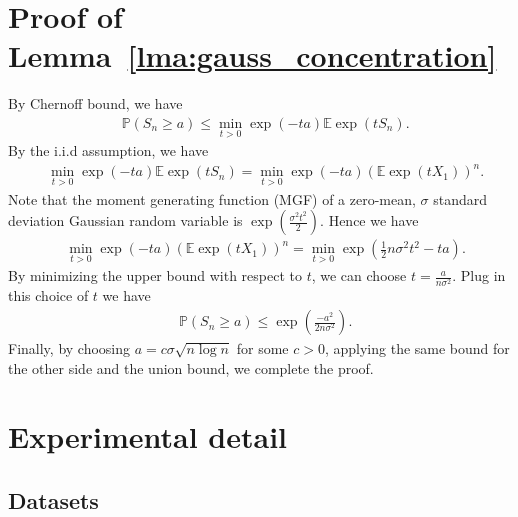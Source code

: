 \documentclass{article} %
\begin{document}
\section{Proof of Lemma~\ref{lma:gauss_concentration}}
By Chernoff bound, we have
\begin{align}
	& \mathbb{P}\left(S_n \geq a\right) \leq \min_{t>0}\exp(-ta)\mathbb{E}\exp(tS_n).
\end{align}
By the i.i.d assumption, we have
\begin{align}
	& \min_{t>0}\exp(-ta)\mathbb{E}\exp(tS_n) = \min_{t>0}\exp(-ta)(\mathbb{E}\exp(tX_1))^n.
\end{align}
Note that the moment generating function (MGF) of a zero-mean, $\sigma$ standard deviation Gaussian random variable is $\exp(\frac{\sigma^2t^2}{2})$. Hence we have
\begin{align}
	& \min_{t>0}\exp(-ta)(\mathbb{E}\exp(tX_1))^n = \min_{t>0}\exp(\frac{1}{2}n\sigma^2t^2-ta).
\end{align}
By minimizing the upper bound with respect to $t$, we can choose $t=\frac{a}{n\sigma^2}$. Plug in this choice of $t$ we have
\begin{align}
	& \mathbb{P}\left(S_n \geq a\right) \leq \exp(\frac{-a^2}{2n\sigma^2}).
\end{align}
Finally, by choosing $a=c\sigma \sqrt{n\log n}$ for some $c>0$, applying the same bound for the other side and the union bound, we complete the proof.


\section{Experimental detail}

\subsection{Datasets}
\label{apx:exp-data}

\end{document}
